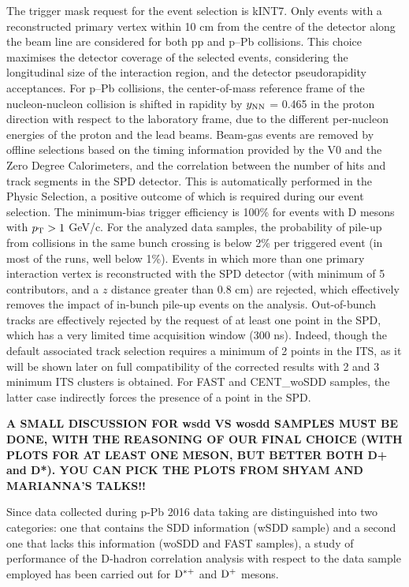 The trigger mask request for the event selection is kINT7. Only events with a reconstructed primary vertex within 10 cm from the centre of the detector along the beam line are considered for both pp and p–Pb collisions. This choice maximises the detector coverage of the selected events, considering the longitudinal size of the interaction region, and
the detector pseudorapidity acceptances. For p–Pb collisions, the center-of-mass reference frame of the nucleon-nucleon collision is shifted in rapidity by $y_{\rm NN}$ = 0.465 in the proton direction with respect to the laboratory frame, due to the different per-nucleon energies of the proton and the lead beams.
Beam-gas events are removed by offline selections based on the timing information provided by the V0 and the Zero Degree Calorimeters, and the correlation between the number of hits and track segments in the SPD detector. This is automatically performed in the Physic Selection, a positive outcome of which is required during our event selection.
The minimum-bias trigger efficiency is 100\% for events with D mesons with $p_{\rm T} > 1$ GeV/c. For the analyzed data samples, the probability of
pile-up from collisions in the same bunch crossing is below 2\% per triggered event (in most of the runs, well below 1\%). Events in which more than one primary interaction vertex is reconstructed with the SPD detector (with minimum of 5 contributors, and a $z$ distance greater than 0.8 cm) are
rejected, which effectively removes the impact of in-bunch pile-up events on the analysis. Out-of-bunch tracks are effectively rejected by the request of at least one point in the SPD, which has a very limited time acquisition window (300 ns). Indeed, though the default associated track selection requires a minimum of 2 points in the ITS, as it will be shown later on full compatibility of the corrected results with 2 and 3 minimum ITS clusters is obtained. For FAST and CENT_woSDD samples, the latter case indirectly forces the presence of a point in the SPD. 

{\bf A SMALL DISCUSSION FOR wsdd VS wosdd SAMPLES MUST BE DONE, WITH THE REASONING OF OUR FINAL CHOICE (WITH PLOTS FOR AT LEAST ONE MESON, BUT BETTER BOTH D+ and D*). YOU CAN PICK THE PLOTS FROM SHYAM AND MARIANNA'S TALKS!!} 

Since data collected during p-Pb 2016 data taking are distinguished into two categories: one that contains the SDD information (wSDD sample) and a second one that lacks this information (woSDD and FAST samples), a study of performance of the D-hadron correlation analysis with respect to the data sample employed has been carried out for ${\rm D^{*+}}$ and ${\rm D^+}$ mesons. 

